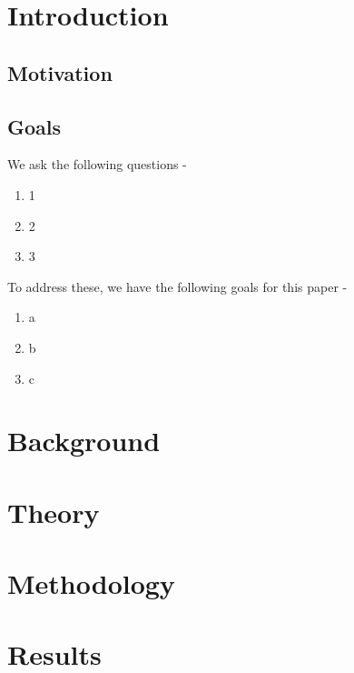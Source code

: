 \documentclass[11pt,a4paper]{article}
\begin{document}
\setcounter{page}{1}


\section{Introduction} \label{sec-intro}

\subsection{Motivation} \label{sec-motiv}

\subsection{Goals} \label{sec-goals}
We ask the following questions - 
\begin{enumerate}[topsep=0pt,itemsep=-0.75ex,partopsep=1ex,parsep=1ex,leftmargin=*,label=(\arabic*)]
    \item 1 
    \item 2
    \item 3
\end{enumerate}

To address these, we have the following goals for this paper - 
\begin{enumerate}[topsep=0pt,itemsep=-0.75ex,partopsep=1ex,parsep=1ex,leftmargin=*,label=(\arabic*)]
    \item a
    \item b
    \item c
\end{enumerate}


\newpage


\section{Background} \label{sec-bak}


\newpage


\section{Theory} \label{sec-theo}


\newpage


\section{Methodology} \label{sec-meth}


\newpage


\section{Results} \label{sec-res}
\end{document}
